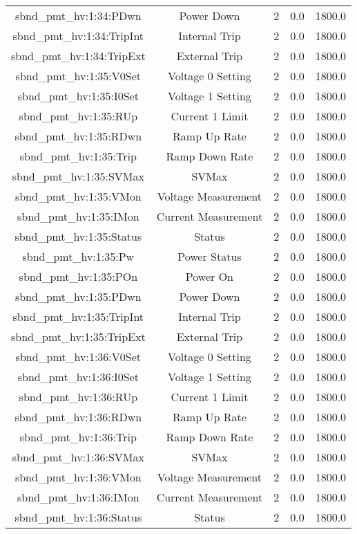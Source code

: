 \begin{table}[ptb]
\begin{tabular}{c | c c c c}
sbnd_pmt_hv:1:34:PDwn & Power Down & 2 & 0.0 & 1800.0\\ 
sbnd_pmt_hv:1:34:TripInt & Internal Trip & 2 & 0.0 & 1800.0\\ 
sbnd_pmt_hv:1:34:TripExt & External Trip & 2 & 0.0 & 1800.0\\ 
sbnd_pmt_hv:1:35:V0Set & Voltage 0 Setting & 2 & 0.0 & 1800.0\\ 
sbnd_pmt_hv:1:35:I0Set & Voltage 1 Setting & 2 & 0.0 & 1800.0\\ 
sbnd_pmt_hv:1:35:RUp & Current 1 Limit & 2 & 0.0 & 1800.0\\ 
sbnd_pmt_hv:1:35:RDwn & Ramp Up Rate & 2 & 0.0 & 1800.0\\ 
sbnd_pmt_hv:1:35:Trip & Ramp Down Rate & 2 & 0.0 & 1800.0\\ 
sbnd_pmt_hv:1:35:SVMax & SVMax & 2 & 0.0 & 1800.0\\ 
sbnd_pmt_hv:1:35:VMon & Voltage Measurement & 2 & 0.0 & 1800.0\\ 
sbnd_pmt_hv:1:35:IMon & Current Measurement & 2 & 0.0 & 1800.0\\ 
sbnd_pmt_hv:1:35:Status & Status & 2 & 0.0 & 1800.0\\ 
sbnd_pmt_hv:1:35:Pw & Power Status & 2 & 0.0 & 1800.0\\ 
sbnd_pmt_hv:1:35:POn & Power On & 2 & 0.0 & 1800.0\\ 
sbnd_pmt_hv:1:35:PDwn & Power Down & 2 & 0.0 & 1800.0\\ 
sbnd_pmt_hv:1:35:TripInt & Internal Trip & 2 & 0.0 & 1800.0\\ 
sbnd_pmt_hv:1:35:TripExt & External Trip & 2 & 0.0 & 1800.0\\ 
sbnd_pmt_hv:1:36:V0Set & Voltage 0 Setting & 2 & 0.0 & 1800.0\\ 
sbnd_pmt_hv:1:36:I0Set & Voltage 1 Setting & 2 & 0.0 & 1800.0\\ 
sbnd_pmt_hv:1:36:RUp & Current 1 Limit & 2 & 0.0 & 1800.0\\ 
sbnd_pmt_hv:1:36:RDwn & Ramp Up Rate & 2 & 0.0 & 1800.0\\ 
sbnd_pmt_hv:1:36:Trip & Ramp Down Rate & 2 & 0.0 & 1800.0\\ 
sbnd_pmt_hv:1:36:SVMax & SVMax & 2 & 0.0 & 1800.0\\ 
sbnd_pmt_hv:1:36:VMon & Voltage Measurement & 2 & 0.0 & 1800.0\\ 
sbnd_pmt_hv:1:36:IMon & Current Measurement & 2 & 0.0 & 1800.0\\ 
sbnd_pmt_hv:1:36:Status & Status & 2 & 0.0 & 1800.0\\ 

\end{tabular}
\end{table}
